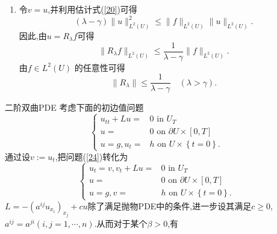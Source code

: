 \begin{frame}[t]
  \begin{enumerate}
    \item [] 令$v=u$,并利用估计式(\ref{20})可得
       \[
	 \left( \lambda-\gamma \right) \|u\|^2_{L^2(U)}\le \|f\|_{L^2(U)}\|u\|_{L^2(U)}.
      \]
      因此,由$u=R_\lambda f$可得
      \[
	\|R_\lambda f\|_{L^2(U)}\le \frac{1}{\lambda-\gamma}\|f\|_{L^2(U)}.
      \]
      由$f\in L^2(U)$ 的任意性可得
      \begin{equation}
	\|R_\lambda\|\le \frac{1}{\lambda-\gamma}\quad \left( \lambda>\gamma \right) .
      \end{equation} 
  \end{enumerate}
\end{frame}

\begin{frame}[t]{二阶双曲PDE}
  考虑下面的初边值问题
  \begin{equation}\label{24}
    \left\{
      \begin{aligned}
	u_{tt}+Lu=&0 \text{ in }U_{T}\\
	u=&0 \text{ on }\partial U\times [0,T]\\
	u=g,u_t=&h \text{ on } U\times \left\{t=0\right\} .
      \end{aligned}
      \right.
  \end{equation}
  通过设$v:=u_t$,把问题(\ref{24})转化为
   \begin{equation}
    \left\{
      \begin{aligned}
	u_t=v,v_t+Lu=&0 \text{ in }U_T\\
	u=&0 \text{ on }\partial U\times [0,T]\\
	u=g,v=&h \text{ on } U\times \left\{t=0\right\} .
      \end{aligned}
      \right.
  \end{equation}
  $L=-\left( a^{ij}u_{x_i} \right) _{x_j}+cu$除了满足抛物PDE中的条件,进一步设其满足$c\ge 0$,$a^{ij}=a^{ji} (i,j=1,\cdots,n)$.从而对于某个$\beta>0$,有
\end{frame}

